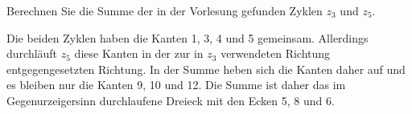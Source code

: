 Berechnen Sie die Summe der in der Vorlesung gefunden Zyklen
$z_3$ und $z_5$.

\begin{loesung}
Die beiden Zyklen haben die Kanten 1, 3, 4 und 5 gemeinsam.
Allerdings durchläuft $z_5$ diese Kanten in der zur in $z_3$ verwendeten
Richtung entgegengesetzten Richtung.
In der Summe heben sich die Kanten daher auf und es bleiben nur
die Kanten 9, 10 und 12.
Die Summe ist daher das im Gegenurzeigersinn durchlaufene Dreieck 
mit den Ecken 5, 8 und 6.
\end{loesung}
